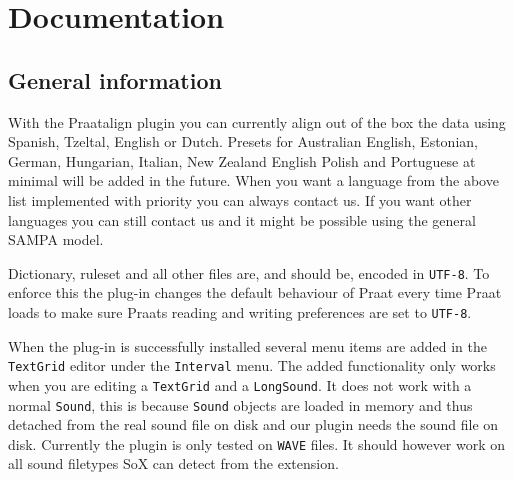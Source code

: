 \chapter{Documentation}
\section{General information}
With the Praatalign plugin you can currently align out of the box the data
using Spanish, Tzeltal, English or Dutch. Presets for
Australian English, Estonian, German, Hungarian, Italian, New Zealand English
Polish and Portuguese at minimal will be added in the future. When you want a
language from the above list implemented with priority you can always contact
us. If you want other languages you can still contact us and it might be
possible using the general SAMPA model.

Dictionary, ruleset and all other files are, and should be, encoded in
\texttt{UTF-8}. To enforce this the plug-in changes the default behaviour of
Praat every time Praat loads to make sure Praats reading and writing
preferences are set to \texttt{UTF-8}.

When the plug-in is successfully installed several menu items are added in the
\texttt{TextGrid} editor under the \texttt{Interval} menu. The added
functionality only works when you are editing a \texttt{TextGrid} and a
\texttt{LongSound}. It does not work with a normal \texttt{Sound}, this is
because \texttt{Sound} objects are loaded in memory and thus detached from the
real sound file on disk and our plugin needs the sound file on disk. Currently
the plugin is only tested on \texttt{WAVE} files. It should however work on all
sound filetypes SoX can detect from the extension.

